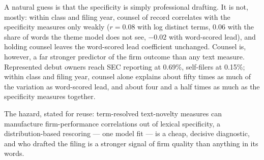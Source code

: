 A natural guess is that the specificity is simply professional
drafting. It is not, mostly: within class and filing year, counsel of
record correlates with the specificity measures only weakly ($r = 0.08$
with log distinct terms, $0.06$ with the share of words the theme model
does not see, $-0.02$ with word-scored lead), and holding counsel leaves
the word-scored lead coefficient unchanged. Counsel is, however, a far
stronger predictor of the firm outcome than any text measure.
Represented debut owners reach SEC reporting at 0.69\%, self-filers at
0.15\%; within class and filing year, counsel alone explains about fifty
times as much of the variation as word-scored lead, and about four and a
half times as much as the specificity measures together.

The hazard, stated for reuse: term-resolved text-novelty measures can
manufacture firm-performance correlations out of lexical specificity, a
distribution-based rescoring --- one model fit --- is a cheap, decisive
diagnostic, and who drafted the filing is a stronger signal of firm
quality than anything in its words.
